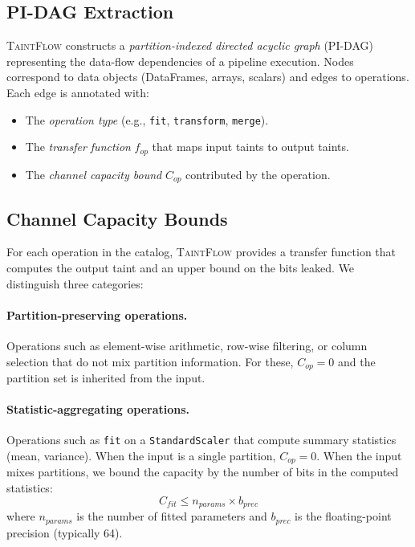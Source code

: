\documentclass[11pt]{article}
\begin{document}
\subsection{PI-DAG Extraction}

\textsc{TaintFlow} constructs a \emph{partition-indexed directed
acyclic graph} (PI-DAG) representing the data-flow dependencies
of a pipeline execution.  Nodes correspond to data objects
(DataFrames, arrays, scalars) and edges to operations.  Each edge is
annotated with:
\begin{itemize}
  \item The \emph{operation type} (e.g., \texttt{fit},
    \texttt{transform}, \texttt{merge}).
  \item The \emph{transfer function} $f_{\mathit{op}}$ that maps
    input taints to output taints.
  \item The \emph{channel capacity bound} $C_{\mathit{op}}$
    contributed by the operation.
\end{itemize}

\subsection{Channel Capacity Bounds}

For each operation in the catalog, \textsc{TaintFlow} provides a
transfer function that computes the output taint and an upper bound
on the bits leaked.  We distinguish three categories:

\paragraph{Partition-preserving operations.}
Operations such as element-wise arithmetic, row-wise filtering, or
column selection that do not mix partition information.  For these,
$C_{\mathit{op}} = 0$ and the partition set is inherited from the
input.

\paragraph{Statistic-aggregating operations.}
Operations such as \texttt{fit} on a \texttt{StandardScaler} that
compute summary statistics (mean, variance).  When the input is a
single partition, $C_{\mathit{op}} = 0$.  When the input mixes
partitions, we bound the capacity by the number of bits in the
computed statistics:
\begin{equation}
  C_{\mathit{fit}} \leq n_{\mathit{params}} \times b_{\mathit{prec}}
\end{equation}
where $n_{\mathit{params}}$ is the number of fitted parameters and
$b_{\mathit{prec}}$ is the floating-point precision (typically 64).
\end{document}

